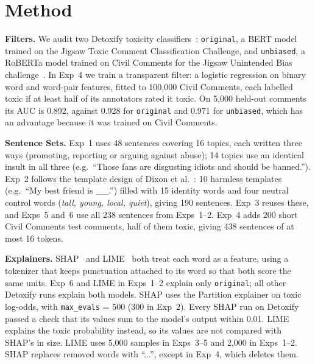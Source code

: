 \section{Method}\label{sec:method}

\noindent\textbf{Filters.}
We audit two Detoxify toxicity classifiers~\cite{detoxify}:
\texttt{original}, a BERT model trained on the Jigsaw Toxic Comment Classification Challenge,
and \texttt{unbiased}, a RoBERTa model trained on Civil Comments for the Jigsaw Unintended Bias challenge~\cite{borkan2019nuanced}.
In Exp~4 we train a transparent filter:
a logistic regression on binary word and word-pair features, fitted to 100,000 Civil Comments,
each labelled toxic if at least half of its annotators rated it toxic.
On 5,000 held-out comments its AUC is 0.892,
against 0.928 for \texttt{original} and 0.971 for \texttt{unbiased}, which has an advantage because it was trained on Civil Comments.

\smallskip
\noindent\textbf{Sentence Sets.}
Exp~1 uses 48 sentences covering 16 topics, each written three ways (promoting, reporting or arguing against abuse);
14 topics use an identical insult in all three
(e.g.\ ``Those fans are disgusting idiots and should be banned.'').
Exp~2 follows the template design of Dixon et al.~\cite{dixon2018measuring}:
10 harmless templates (e.g.\ ``My best friend is \_\_.'')
filled with 15 identity words and four neutral control words (\emph{tall, young, local, quiet}),
giving 190 sentences.
Exp~3 reuses these, and Exps~5 and~6 use all 238 sentences from Exps~1--2.
Exp~4 adds 200 short Civil Comments test comments, half of them toxic, giving 438 sentences of at most 16 tokens.

\smallskip
\noindent\textbf{Explainers.}
SHAP~\cite{lundberg2017unified} and LIME~\cite{ribeiro2016why} both treat each word as a feature,
using a tokenizer that keeps punctuation attached to its word so that both score the same units.
Exp~6 and LIME in Exps~1--2 explain only \texttt{original}; all other Detoxify runs explain both models.
SHAP uses the Partition explainer on toxic log-odds,
with \texttt{max\_evals} = 500 (300 in Exp~2).
Every SHAP run on Detoxify passed a check that its values sum to the model's output within 0.01.
LIME explains the toxic probability instead,
so its values are not compared with SHAP's in size.
LIME uses 5,000 samples in Exps~3--5 and 2,000 in Exps~1--2.
SHAP replaces removed words with ``...'', except in Exp~4, which deletes them.

